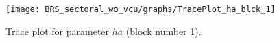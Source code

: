 \begin{figure}[H]
\centering
  \texttt{[image: BRS\_sectoral\_wo\_vcu/graphs/TracePlot\_ha\_blck\_1]}\\
    \caption{Trace plot for parameter ${ha}$ (block number 1).}
\end{figure}

